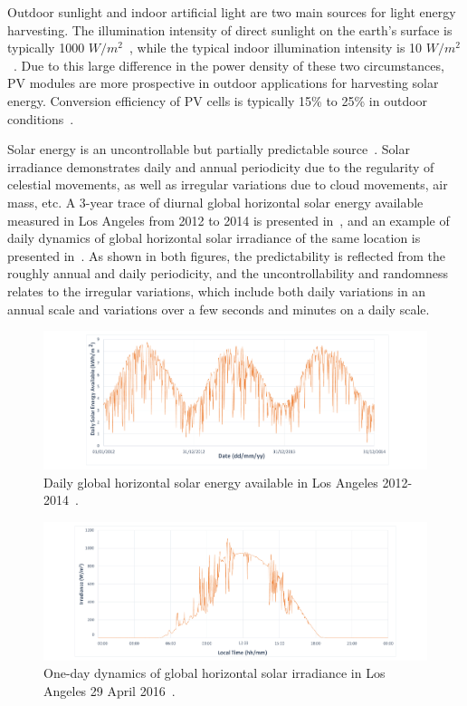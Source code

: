 Outdoor sunlight and indoor artificial light are two main sources for light energy harvesting. The illumination intensity of direct sunlight on the earth's surface is typically 1000 $W/m^2$~\cite{roundy2004power}, while the typical indoor illumination intensity is 10 $W/m^2$~\cite{shaikh2016energy}. Due to this large difference in the power density of these two circumstances, PV modules are more prospective in outdoor applications for harvesting solar energy. Conversion efficiency of PV cells is typically 15\% to 25\% in outdoor conditions~\cite{mathuna2008energy}.  

Solar energy is an uncontrollable but partially predictable source~\cite{heinemann2006forecasting, buchli2014dynamic}. Solar irradiance demonstrates daily and annual periodicity due to the regularity of celestial movements, as well as irregular variations due to cloud movements, air mass, etc. A 3-year trace of diurnal global horizontal solar energy available measured in Los Angeles from 2012 to 2014 is presented in~, and an example of daily dynamics of global horizontal solar irradiance of the same location is presented in~. As shown in both figures, the predictability is reflected from the roughly annual and daily periodicity, and the uncontrollability and randomness relates to the irregular variations, which include both daily variations in an annual scale and variations over a few seconds and minutes on a daily scale. 

\begin{figure}
    \centering
    \includegraphics[width=\columnwidth]{ch2_review/figures/solar_calendar}
    \caption{Daily global horizontal solar energy available in Los Angeles 2012-2014~\cite{nreldata}.}
    \label{Figure:solar_calendar}
\end{figure}

\begin{figure}
    \centering
    \includegraphics[width=\columnwidth]{ch2_review/figures/solar_plots}
    \caption{One-day dynamics of global horizontal solar irradiance in Los Angeles 29 April 2016~\cite{lmu}.}
    \label{Figure:solar_plots}
\end{figure}

